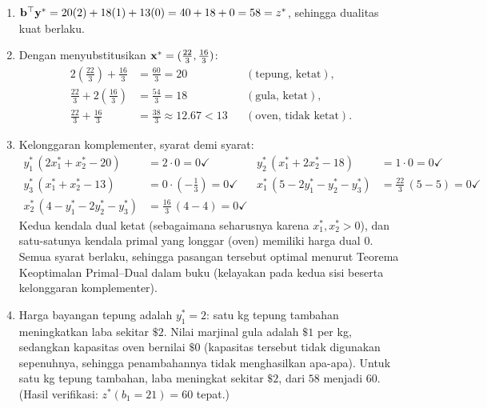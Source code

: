 \begin{enumerate}
\item $\mathbf{b}^\top\mathbf{y}^* = 20(2) + 18(1) + 13(0) = 40 + 18 + 0 = 58 = z^*$, sehingga dualitas kuat berlaku.
\item Dengan menyubstitusikan $\mathbf{x}^* = (\tfrac{22}{3}, \tfrac{16}{3})$:
\[
\begin{aligned}
2\!\left(\tfrac{22}{3}\right) + \tfrac{16}{3} &= \tfrac{60}{3} = 20 && (\text{tepung, ketat}), \\
\tfrac{22}{3} + 2\!\left(\tfrac{16}{3}\right) &= \tfrac{54}{3} = 18 && (\text{gula, ketat}), \\
\tfrac{22}{3} + \tfrac{16}{3} &= \tfrac{38}{3} \approx 12.67 < 13 && (\text{oven, tidak ketat}).
\end{aligned}
\]
\item Kelonggaran komplementer, syarat demi syarat:
\[
\begin{aligned}
y_1^*\,(2x_1^* + x_2^* - 20) &= 2 \cdot 0 = 0 \checkmark
& y_2^*\,(x_1^* + 2x_2^* - 18) &= 1 \cdot 0 = 0 \checkmark \\
y_3^*\,(x_1^* + x_2^* - 13) &= 0 \cdot \left(-\tfrac13\right) = 0 \checkmark
& x_1^*\,(5 - 2y_1^* - y_2^* - y_3^*) &= \tfrac{22}{3}\,(5 - 5) = 0 \checkmark \\
x_2^*\,(4 - y_1^* - 2y_2^* - y_3^*) &= \tfrac{16}{3}\,(4 - 4) = 0 \checkmark &&
\end{aligned}
\]
Kedua kendala dual ketat (sebagaimana seharusnya karena $x_1^*, x_2^* > 0$), dan satu-satunya kendala primal yang longgar (oven) memiliki harga dual $0$. Semua syarat berlaku, sehingga pasangan tersebut optimal menurut Teorema Keoptimalan Primal--Dual dalam buku (kelayakan pada kedua sisi beserta kelonggaran komplementer).
\item Harga bayangan tepung adalah $y_1^* = 2$: satu kg tepung tambahan meningkatkan laba sekitar $\$2$. Nilai marjinal gula adalah $\$1$ per kg, sedangkan kapasitas oven bernilai $\$0$ (kapasitas tersebut tidak digunakan sepenuhnya, sehingga penambahannya tidak menghasilkan apa-apa). Untuk satu kg tepung tambahan, laba meningkat sekitar $\$2$, dari $58$ menjadi $60$. (Hasil verifikasi: $z^*(b_1 = 21) = 60$ tepat.)
\end{enumerate}



